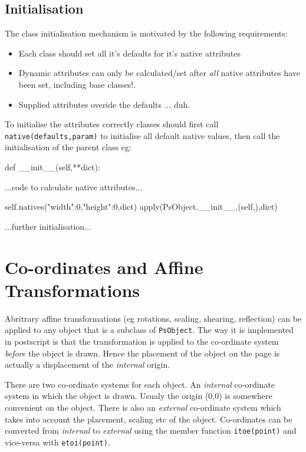 \documentclass[a4paper]{book}
\begin{document}
\subsection{Initialisation}
\label{sec:initialisation}

The class initialisation mechanism is motivated by the following
requirements:

\begin{itemize}
\item Each class should set all it's defaults for it's native attributes
\item Dynamic attributes can only be calculated/set after \emph{all} native
  attributes have been set, including base classes!.
\item Supplied attributes overide the defaults ... duh.
\end{itemize}

To initialise the attributes correctly classes should first call
\Verb|native(defaults,param)| to initialise all default native values, then
call the initialisation of the parent class eg:
\begin{python}
def __init__(self,**dict):
   
   ...code to calculate native attributes...

   self.natives({"width":0,"height":0},dict)
   apply(PsObject.__init__,(self,),dict)

   ...further initialisation...
\end{python}



\section{Co-ordinates and Affine Transformations}
\label{sec:co-ordinates-affine}

Abritrary affine transformations (eg rotations, scaling, shearing,
reflection) can be applied to any object that is a subclass of 
\Verb|PsObject|. The way it is implemented in postscript is that the 
transformation is applied to the co-ordinate system \emph{before}
the object is drawn. Hence the placement of the object on the page
is actually a displacement of the \emph{internal} origin.

There are two co-ordinate systems for each object. An \emph{internal}
co-ordinate system in which the object is drawn. Usualy the origin (0,0) is
somewhere convenient on the object. There is also an \emph{external}
co-ordinate system which takes into account the placement, scaling etc of
the object. Co-ordinates can be converted from \emph{internal} to
\emph{external} using the member function \Verb|itoe(point)| and vice-versa
with \Verb|etoi(point)|.
\end{document}
